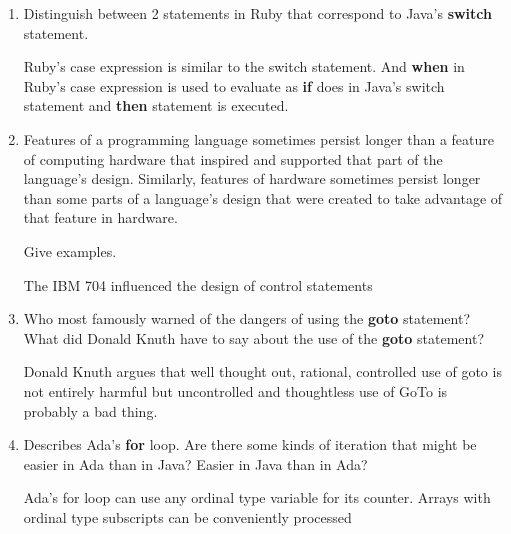 \begin{enumerate}
\begin{answer}
    \end{answer}

  \item Distinguish between 2 statements in Ruby
    that correspond to Java's \textbf{switch} statement.
    
    \begin{answer}
    
    Ruby's case expression is similar to the switch statement. And \textbf{when} in Ruby's case expression is used to evaluate as \textbf{if} does in Java's switch statement and \textbf{then} statement is executed.
    
    \end{answer}

  \item Features of a programming language sometimes persist
    longer than a feature of computing hardware that inspired
    and supported that part of the language's design.
    Similarly, features of hardware sometimes persist longer
    than some parts of a language's design that were created
    to take advantage of that feature in hardware.

    Give examples.
    
    \begin{answer}
    
    The IBM 704 influenced the design of control statements
    
    \end{answer}

  \item Who most famously warned of the dangers of using the
    \textbf{goto} statement? What did Donald Knuth have to
    say about the use of the \textbf{goto} statement?
    
    \begin{answer}
    
    Donald Knuth argues that well thought out, rational, controlled use of goto is not entirely harmful but uncontrolled and thoughtless use of GoTo is probably a bad thing.
    
    \end{answer}

  \item Describes Ada's \textbf{for} loop. Are there some
    kinds of iteration that might be easier in Ada than
    in Java? Easier in Java than in Ada?
    
    \begin{answer}
    
    Ada’s for loop can use any ordinal type variable for its counter. Arrays with ordinal type subscripts can be conveniently processed
    

\end{answer}
\end{enumerate}
